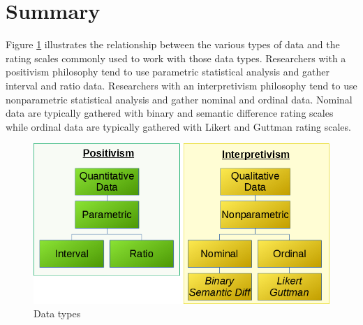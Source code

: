 \section{Summary}\label{ch06:summary}

Figure \ref{fig06.04} illustrates the relationship between the various types of data and the rating scales commonly used to work with those data types. Researchers with a positivism philosophy tend to use parametric statistical analysis and gather interval and ratio data. Researchers with an interpretivism philosophy tend to use nonparametric statistical analysis and gather nominal and ordinal data. Nominal data are typically gathered with binary and semantic difference rating scales while ordinal data are typically gathered with Likert and Guttman rating scales.

\begin{figure}[H]
	\centering
	\includegraphics[width=\maxwidth{.95\linewidth}]{gfx/06-DataTypes}
	\caption{Data types}
	\label{fig06.04}
\end{figure}
